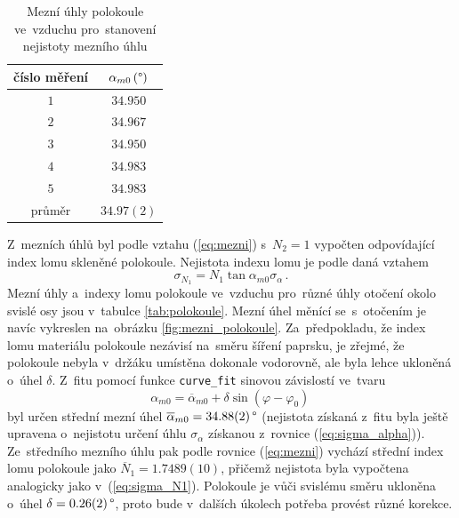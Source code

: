 \documentclass{../concepts/titul_protokol_p/prepareprotokol} %
\begin{document}
\begin{table}[!htbp]
\centering
\caption{Mezní úhly polokoule ve~vzduchu pro~stanovení nejistoty mezního úhlu}
\begin{tabular}{cc}
 \toprule
 číslo měření & $\alpha_{m0}\, (\mathrm{\degree})$ \\
 \midrule
 $1$ & $34.950$ \\
 $2$ & $34.967$ \\
 $3$ & $34.950$ \\
 $4$ & $34.983$ \\
 $5$ & $34.983$ \\
 \midrule
 průměr & $34.97(2)$ \\
 \bottomrule
\end{tabular}
\label{tab:mezni_phi0}
\end{table}

Z~mezních úhlů byl podle vztahu (\ref{eq:mezni}) s~$N_2 = 1$ vypočten odpovídající index lomu skleněné polokoule.
Nejistota indexu lomu je podle \cite{englich} daná vztahem
\begin{equation}
    \label{eq:sigma_N1}
    \sigma_{N_1} = N_1 \tan \alpha_{m0} \sigma_\alpha \,.
\end{equation}
Mezní úhly a~indexy lomu polokoule ve~vzduchu pro~různé úhly otočení okolo svislé osy jsou v~tabulce
\ref{tab:polokoule}. Mezní úhel měnící se~s~otočením je navíc vykreslen na~obrázku \ref{fig:mezni_polokoule}.
Za~předpokladu, že index lomu materiálu polokoule nezávisí na~směru šíření paprsku, je zřejmé, že polokoule nebyla v~držáku
umístěna dokonale vodorovně, ale byla lehce ukloněná o~úhel $\delta$. Z~fitu pomocí funkce \texttt{curve\_fit} sinovou
závislostí ve~tvaru
\begin{equation}
    \label{eq:sinovy_fit}
    \alpha_{m0} = \overline{\alpha}_{m0} + \delta \sin \left(\varphi - \varphi_0\right) \,
\end{equation}
byl určen střední mezní úhel $\overline{\alpha}_{m0} = 34.88(2)\,\degree$ (nejistota získaná z~fitu byla
ještě upravena o~nejistotu určení úhlu $\sigma_\alpha$ získanou z~rovnice (\ref{eq:sigma_alpha})). 
Ze~středního mezního úhlu pak podle rovnice (\ref{eq:mezni})
vychází střední index lomu polokoule jako $\overline{N}_1 = 1.7489(10)$, přičemž nejistota byla vypočtena
analogicky jako v~(\ref{eq:sigma_N1}). Polokoule je vůči svislému směru ukloněna o~úhel $\delta = 0.26(2)\,\degree$,
proto bude v~dalších úkolech potřeba provést různé korekce.


\end{document}
